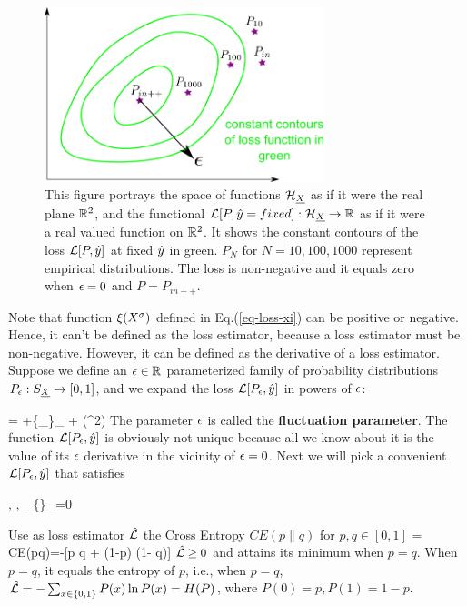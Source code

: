 \begin{figure}[h!]
\centering
\includegraphics[width=3.2in]
{targeted-est/targeted-est.png}
\caption{
This figure portrays
the space of functions ${\cal H}_{\underline{X}}$
as if it were the real plane ${ \mathbb{R}}^2$,
and the functional ${\cal L}[P, {\hat{y}}=fixed]:{\cal H}_{\underline{X}}
\rightarrow{ \mathbb{R}}$
as if it were a real valued function on ${ \mathbb{R}}^2$.
It shows  the constant contours
of the loss ${\cal L}[P, {\hat{y}}]$
at fixed ${\hat{y}}$ in green.
$P_N$ for $N=10, 100, 1000$
represent empirical distributions.
The loss is non-negative and it equals
zero when $\epsilon=0$ and $P=P_{in++}$.
}
\label{fig-targeted-est}
\end{figure}

Note that function $\xi(X^\sigma)$ defined in Eq.(\ref{eq-loss-xi})
can be positive or negative. Hence,
 it can't be defined as the loss estimator,
because a loss estimator must be non-negative. However, it can be
defined as the derivative of a loss estimator. Suppose we define an $\epsilon\in{ \mathbb{R}}$
parameterized
family of probability distributions $P_\epsilon:S_{\underline{X}}\rightarrow [0,1]$,
and we expand the loss ${\cal L}[P_\epsilon, {\hat{y}}]$
in powers of $\epsilon$:

\beq
{} = \call[P_0, \haty]
+\eps \{\partial_\eps {}\}_{} + \calo(\eps^2)
\eeq
The parameter $\epsilon$ is called the {\bf fluctuation parameter}.
The function ${\cal L}[P_\epsilon, {\hat{y}}]$ is obviously
not unique because all we know about it
is the value of its $\epsilon$ derivative
in the vicinity of $\epsilon=0$. Next we will pick a convenient
${\cal L}[P_\epsilon, {\hat{y}}]$ that satisfies

\beq
{},\quad
{}, \quad \partial_\eps \{\}_{}=0
\eeq


Use as loss estimator $\hat{{\cal L}}$ the Cross Entropy
$CE(p\parallel q)$ for $p, q\in [0,1]$
\beq
\hatl = CE(p\parallel q)=-[p \ln q + (1-p) \ln(1- q)]
\eeq
$\hat{{\cal L}}\geq 0$ and attains its minimum when $p=q$.
When $p=q$, it equals the entropy of $p$,
i.e., when $p=q$, $\hat{{\cal L}}=-\sum_{x\in \{0,1\}} P(x)\ln P(x)= H(P)$,
where $P(0)=p, P(1)=1-p$.

